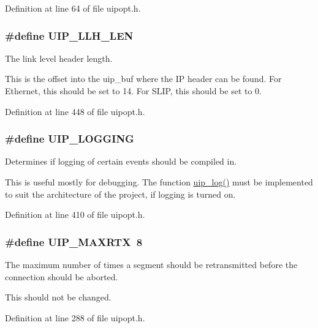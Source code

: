 Definition at line 64 of file uipopt.h.

\hypertarget{group__uipopt_gae6f4a2453dbd8bc60e6a82774552366a}{
\subsubsection[{UIP\_\-LLH\_\-LEN}]{\setlength{\rightskip}{0pt plus 5cm}\#define UIP\_\-LLH\_\-LEN}}
\label{group__uipopt_gae6f4a2453dbd8bc60e6a82774552366a}
The link level header length.

This is the offset into the uip\_\-buf where the IP header can be found. For Ethernet, this should be set to 14. For SLIP, this should be set to 0. 

Definition at line 448 of file uipopt.h.

\hypertarget{group__uipopt_ga21664b7441cfa37d280228d23316d609}{
\subsubsection[{UIP\_\-LOGGING}]{\setlength{\rightskip}{0pt plus 5cm}\#define UIP\_\-LOGGING}}
\label{group__uipopt_ga21664b7441cfa37d280228d23316d609}
Determines if logging of certain events should be compiled in.

This is useful mostly for debugging. The function \hyperlink{group__uipopt_gab58e1ceb7cb73ca2bcd73146b6c1b4e7}{uip\_\-log()} must be implemented to suit the architecture of the project, if logging is turned on. 

Definition at line 410 of file uipopt.h.

\hypertarget{group__uipopt_ga67cf1e0d2324c93f332c1f020c0fe8b3}{
\subsubsection[{UIP\_\-MAXRTX}]{\setlength{\rightskip}{0pt plus 5cm}\#define UIP\_\-MAXRTX~8}}
\label{group__uipopt_ga67cf1e0d2324c93f332c1f020c0fe8b3}
The maximum number of times a segment should be retransmitted before the connection should be aborted.

This should not be changed. 

Definition at line 288 of file uipopt.h.

